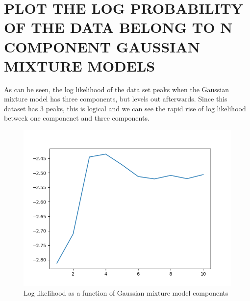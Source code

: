 \documentclass{article}
\begin{document}
\section{\MakeUppercase{Plot the log probability of the data belong to n component Gaussian mixture models}}
As can be seen, the log likelihood of the data set peaks when the Gaussian mixture model has three components, but levels out afterwards. Since this dataset has 3 peaks, this is logical and we can see the rapid rise of log likelihood betweek one componenet and three components. 
\begin{figure}[!htb]
	\centering
	\begin{minipage}{0.49\textwidth}
			\centering
			\includegraphics[width=1\linewidth]{../q1to6pics/q4.png}
			\caption{Log likelihood as a function of Gaussian mixture model components}
	\end{minipage}\hfill
\end{figure}
\pagebreak
\end{document}
